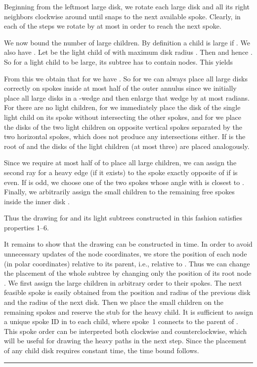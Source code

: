 \documentclass[11pt]{article}
\newcommand{\qed}{\hspace*{\fill}\rule{6pt}{6pt}}
\newenvironment{proof}{\noindent{\bf Proof:}}{\bigskip} \makeatletter
\begin{document}
\begin{proof}
  Beginning from the leftmost large disk, we rotate each large disk
   and all its right neighbors clockwise around  until 
  snaps to the next available spoke. Clearly, in each of the 
  steps we rotate by at most  in order to reach the next
  spoke.

  We now bound the number  of large children. By definition a
  child is large if . We also have . Let  be the light child of
   with maximum disk radius . Then  and hence . So for a light
  child  to be large, its subtree  has to contain  nodes. This yields
  
  
  From this we obtain that for  we have . So for  we can always place all large disks
  correctly on spokes inside at most half of the outer annulus 
  since we initially place all large disks in a -wedge and then
  enlarge that wedge by at most 
  radians. For  there are no light children, for  we
  immediately place the disk of the single light child on its spoke without
  intersecting the other spokes, and for  we place the disks of the two light children on opposite vertical spokes separated by the two
  horizontal spokes, which does not produce any intersections either. If  is the root of  and  the disks of the light children (at most three) are placed analogously.

  Since we require at most half of  to place all large children, we
  can assign the second ray for a heavy edge (if it exists) to the spoke exactly opposite of
   if  is even. If  is odd, we choose
  one of the two spokes whose angle with  is
  closest to . 
Finally, we arbitrarily assign the  small children to the
  remaining free spokes inside the inner disk .

  Thus the drawing for  and its light subtrees constructed in this fashion satisfies properties 1--6. 

	It remains to show that the drawing can be constructed in  time. 
	In order to avoid unnecessary updates of the node coordinates, we store the position of each node (in polar coordinates) relative to its parent, i.e., relative to . 
	Thus we can change the placement of the whole subtree  by changing only the position of its root node .
	We first assign the large children in arbitrary order to their spokes. 
	The next feasible spoke is easily obtained from the position and radius of the previous disk and the radius of the next disk.
	Then we place the small children on the remaining spokes and reserve the stub for the heavy child.
	It is sufficient to assign a unique spoke ID in  to each child, where spoke~1 connects to the parent of . 
	This spoke order can be interpreted both clockwise and counterclockwise, which will be useful for drawing the heavy paths in the next step.
  Since the placement of any child disk requires constant time, the  time bound follows. \qed
\end{proof}
\end{document}
